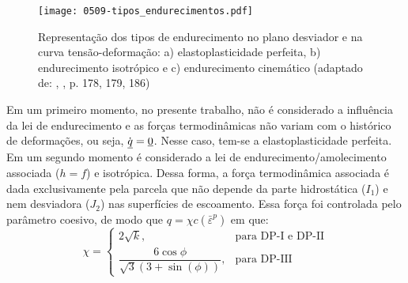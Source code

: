 \begin{figure}[H]
	\begin{center}
		\texttt{[image: 0509-tipos\_endurecimentos.pdf]}
	\end{center}
	\caption{\label{tipos_endurecimento}Representação dos tipos de endurecimento no plano desviador e na curva tensão-deformação: a) elastoplasticidade perfeita, b) endurecimento isotrópico e c) endurecimento cinemático (adaptado de: \citeauthor{Neto2008}, \citeyear{Neto2008}, p. 178, 179, 186)}
\end{figure}
Em um primeiro momento, no presente trabalho, não é considerado a influência da lei de endurecimento e as forças termodinâmicas não variam com o histórico de deformações, ou seja, $\dot {\underline q} = \underline 0$. Nesse caso, tem-se a elastoplasticidade perfeita. Em um segundo momento é considerado a lei de endurecimento/amolecimento associada ($h = f$) e isotrópica. Dessa forma, a força termodinâmica associada é dada exclusivamente pela parcela que não depende da parte hidrostática ($I_1$) e nem desviadora ($J_2$) nas superfícies de escoamento. Essa força foi controlada pelo parâmetro coesivo, de modo que $q = \chi c(\bar \varepsilon^p)$ em que:
\begin{equation}
	\label{eq:dfdc}
	\chi = \left\{ \begin{array}{ll} 
		2\sqrt{k}, & \text{para DP-I e DP-II} \\
		\dfrac{6\cos{\phi}}{\sqrt{3}(3 + \sin(\phi))}, & \text{para DP-III}\end{array}	
	\right.
\end{equation}



